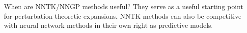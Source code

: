 \documentclass[book.tex]{subfiles}
\begin{document}



When are NNTK/NNGP methods useful? They serve as a useful starting point for perturbation theoretic expansions. NNTK methods can also be competitive with neural network methods in their own right as predictive models.
\end{document}
